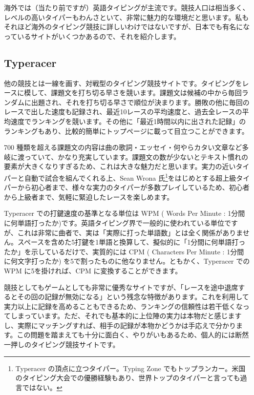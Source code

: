 海外では（当たり前ですが）英語タイピングが主流です。競技人口は相当多く、レベルの高いタイパーもわんさといて、非常に魅力的な環境だと思います。私もそれほど海外のタイピング競技に詳しいわけではないですが、日本でも有名になっているサイトがいくつかあるので、それを紹介します。

\subsection{Typeracer}

他の競技とは一線を画す、対戦型のタイピング競技サイトです。タイピングをレースに模して、課題文を打ち切る早さを競います。課題文は候補の中から毎回ランダムに出題され、それを打ち切る早さで順位が決まります。勝敗の他に毎回のレースで出した速度も記録され、最近10レースの平均速度と、過去全レースの平均速度でランキングを競います。その他に「最近1時間以内に出された記録」のランキングもあり、比較的簡単にトップページに載って目立つことができます。

700 種類を超える課題文の内容は曲の歌詞・エッセイ・何やらカタい文章など多岐に渡っていて、かなり充実しています。課題文の数が少ないとテキスト慣れの要素が大きくなりすぎるため、これは大きな魅力だと思います。実力の近いタイパーと自動で試合を組んでくれる上、Sean Wrona 氏\footnote{Typeracer の頂点に立つタイパー。Typing Zone でもトップランカー。米国のタイピング大会での優勝経験もあり、世界トップのタイパーと言っても過言ではない。}をはじめとする超上級タイパーから初心者まで、様々な実力のタイパーが多数プレイしているため、初心者から上級者まで、気軽に緊迫したレースを楽しめます。

Typeracer での打鍵速度の基準となる単位は WPM ( Words Per Minute : 1分間に何単語打ったか)です。英語タイピング界で一般的に使われている単位ですが、これは非常に曲者で、実は「実際に打った単語数」とは全く関係がありません。スペースを含めた5打鍵を1単語と換算して、擬似的に「1分間に何単語打ったか」を示しているだけで、実質的には CPM ( Characters Per Minute : 1分間に何文字打ったか) を5で割ったものに他なりません。ともかく、Typeracer での WPM に5を掛ければ、CPM に変換することができます。

競技としてもゲームとしても非常に優秀なサイトですが、「レースを途中退席するとその回の記録が無効になる」という残念な特徴があります。これを利用して実力以上に記録を高めることもできるため、ランキングの信頼性は若干低くなってしまっています。ただ、それでも基本的に上位陣の実力は本物だと感じますし、実際にマッチングすれば、相手の記録が本物かどうかは手応えで分かります。この問題を踏まえても十分に面白く、やりがいもあるため、個人的には断然一押しのタイピング競技サイトです。

